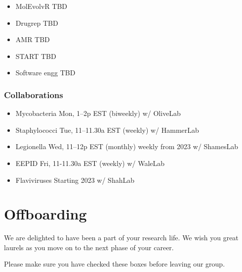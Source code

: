 \documentclass[
  letterpaper,
  DIV=11,
  numbers=noendperiod]{scrreprt}
\providecommand{\tightlist}{%
  \setlength{\itemsep}{0pt}\setlength{\parskip}{0pt}}\usepackage{longtable,booktabs,array}
\begin{document}
\begin{itemize}
\tightlist
\item
  MolEvolvR \textbar{} TBD
\item
  Drugrep \textbar{} TBD
\item
  AMR \textbar{} TBD
\item
  START \textbar{} TBD
\item
  Software engg \textbar{} TBD
\end{itemize}

\hypertarget{collaborations}{%
\subsection{Collaborations}\label{collaborations}}

\begin{itemize}
\tightlist
\item
  Mycobacteria \textbar{} Mon, 1--2p EST (biweekly) \textbar{} w/
  OliveLab
\item
  Staphylococci \textbar{} Tue, 11--11.30a EST (weekly) \textbar{} w/
  HammerLab
\item
  Legionella \textbar{} Wed, 11--12p EST (monthly) \textbar{} weekly
  from 2023 \textbar{} w/ ShamesLab
\item
  EEPID \textbar{} Fri, 11-11.30a EST (weekly) \textbar{} w/ WaleLab
\item
  Flaviviruses \textbar{} Starting 2023 \textbar{} w/ ShahLab
\end{itemize}


\hypertarget{offboarding}{%
\chapter{Offboarding}\label{offboarding}}

We are delighted to have been a part of your research life. We wish you
great laurels as you move on to the next phase of your career.

Please make sure you have checked these boxes before leaving our group.
\end{document}
